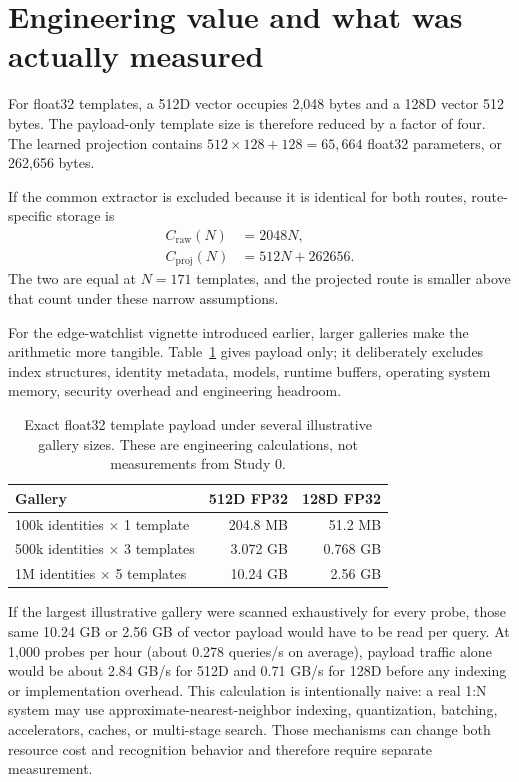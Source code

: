 \documentclass[10pt,a4paper]{article}
\begin{document}
\section{Engineering value and what was actually measured}\label{sec:engineering}

For float32 templates, a 512D vector occupies 2,048 bytes and a 128D vector 512 bytes. The
payload-only template size is therefore reduced by a factor of four. The learned projection
contains $512\times128+128=65{,}664$ float32 parameters, or 262,656 bytes.

If the common extractor is excluded because it is identical for both routes, route-specific
storage is
\begin{align}
C_{\mathrm{raw}}(N) &= 2048N,\\
C_{\mathrm{proj}}(N) &= 512N + 262656.
\end{align}
The two are equal at $N=171$ templates, and the projected route is smaller above that count
under these narrow assumptions.

For the edge-watchlist vignette introduced earlier, larger galleries make the arithmetic
more tangible. Table~\ref{tab:gallery-payload} gives payload only; it deliberately excludes
index structures, identity metadata, models, runtime buffers, operating system memory,
security overhead and engineering headroom.

\begin{table}[ht]
\centering
\caption{Exact float32 template payload under several illustrative gallery sizes. These are
engineering calculations, not measurements from Study 0.}
\label{tab:gallery-payload}
\begin{tabular}{@{}lrr@{}}
\toprule
Gallery & 512D FP32 & 128D FP32\\
\midrule
100k identities $\times$ 1 template & 204.8 MB & 51.2 MB\\
500k identities $\times$ 3 templates & 3.072 GB & 0.768 GB\\
1M identities $\times$ 5 templates & 10.24 GB & 2.56 GB\\
\bottomrule
\end{tabular}
\end{table}

If the largest illustrative gallery were scanned exhaustively for every probe, those same
10.24 GB or 2.56 GB of vector payload would have to be read per query. At 1,000 probes per
hour (about 0.278 queries/s on average), payload traffic alone would be about 2.84 GB/s for
512D and 0.71 GB/s for 128D before any indexing or implementation overhead. This calculation
is intentionally naive: a real 1:N system may use approximate-nearest-neighbor indexing,
quantization, batching, accelerators, caches, or multi-stage search. Those mechanisms can
change both resource cost and recognition behavior and therefore require separate
measurement.
\end{document}
